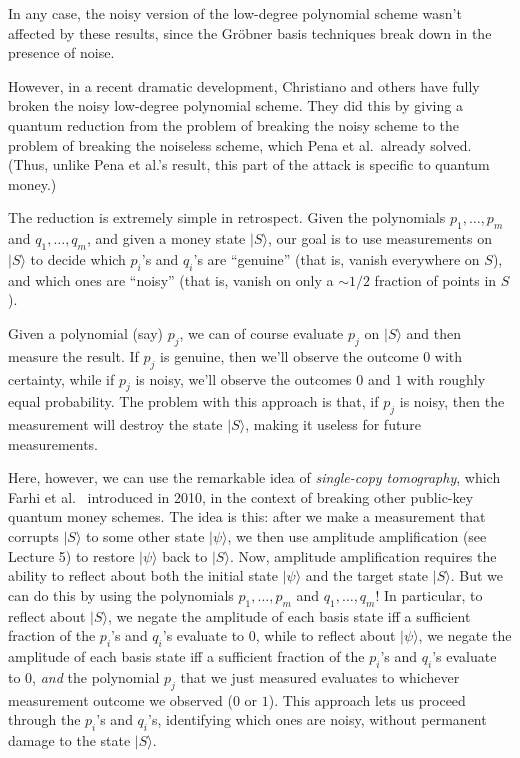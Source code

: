 \documentclass[11pt]{report}
\theoremstyle{plain}
\theoremstyle{definition}
\renewcommand{\ket}[1]{|#1\rangle}
\begin{document}
In any case, the noisy version of the low-degree polynomial scheme wasn't affected by these results, since the Gr\"{o}bner basis techniques break down in the presence of noise.

However, in a recent dramatic development, Christiano and others have fully broken the noisy low-degree polynomial scheme.  They did this by giving a quantum reduction from the problem of breaking the noisy scheme to the problem of breaking the noiseless scheme, which Pena et al.\ already solved.  (Thus, unlike Pena et al.'s result, this part of the attack is specific to quantum money.)

The reduction is extremely simple in retrospect.  Given the polynomials $p_1,\ldots,p_m$ and $q_1,\ldots,q_m$, and given a money state $\ket{S}$, our goal is to use measurements on $\ket{S}$ to decide which $p_i$'s and $q_i$'s are ``genuine'' (that is, vanish everywhere on $S$), and which ones are ``noisy'' (that is, vanish on only a $\sim 1/2$ fraction of points in $S$).

Given a polynomial (say) $p_j$, we can of course evaluate $p_j$ on $\ket{S}$ and then measure the result.  If $p_j$ is genuine, then we'll observe the outcome $0$ with certainty, while if $p_j$ is noisy, we'll observe the outcomes $0$ and $1$ with roughly equal probability.  The problem with this approach is that, if $p_j$ is noisy, then the measurement will destroy the state $\ket{S}$, making it useless for future measurements.

Here, however, we can use the remarkable idea of {\em single-copy tomography}, which Farhi et al.\ \cite{farhi:restore} introduced in 2010, in the context of breaking other public-key quantum money schemes.  The idea is this: after we make a measurement that corrupts $\ket{S}$ to some other state $\ket{\psi}$, we then use amplitude amplification (see Lecture 5) to restore $\ket{\psi}$ back to $\ket{S}$.  Now, amplitude amplification requires the ability to reflect about both the initial state $\ket{\psi}$ and the target state $\ket{S}$.  But we can do this by using the polynomials $p_1,\ldots,p_m$ and $q_1,\ldots,q_m$!  In particular, to reflect about $\ket{S}$, we negate the amplitude of each basis state iff a sufficient fraction of the $p_i$'s and $q_i$'s evaluate to $0$, while to reflect about $\ket{\psi}$, we negate the amplitude of each basis state iff a sufficient fraction of the $p_i$'s and $q_i$'s evaluate to $0$, {\em and} the polynomial $p_j$ that we just measured evaluates to whichever measurement outcome we observed ($0$ or $1$).  This approach lets us proceed through the $p_i$'s and $q_i$'s, identifying which ones are noisy, without permanent damage to the state $\ket{S}$.
\end{document}
